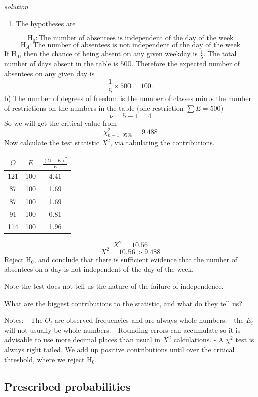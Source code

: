 \documentclass[
]{book}
\providecommand{\tightlist}{%
  \setlength{\itemsep}{0pt}\setlength{\parskip}{0pt}}
\theoremstyle{definition}
\theoremstyle{definition}
\theoremstyle{definition}
\theoremstyle{definition}
\theoremstyle{remark}
\begin{document}
\emph{solution}

\begin{enumerate}
\def\labelenumi{\alph{enumi})}
\tightlist
\item
  The hypotheses are
\end{enumerate}

\[\text{H}_0: \text{The number of absentees is independent of the day of the week}\]
\[\text{H}_A: \text{The number of absentees is not independent of the day of the week}\]
If \(\text{H}_0\), then the chance of being absent on any given weekday is \(\frac{1}{5}\). The total number of days absent in the table is \(500\). Therefore the expected number of absentees on any given day is
\[\frac{1}{5}\times 500 = 100.\]
b) The number of degrees of freedom is the number of classes minus the number of restrictions on the numbers in the table (one restriction \(\sum E= 500\))
\[\nu=5-1=4\]
So we will get the critical value from
\[\chi^2_{n-1, \ 95\%} =9.488\]
Now calculate the test statistic \(X^2\), via tabulating the contributions.

\begin{longtable}[]{@{}ccc@{}}
\toprule
\(O\) & \(E\) & \(\frac{(O-E)^2}{E}\)\tabularnewline
\midrule
\endhead
121 & 100 & 4.41\tabularnewline
87 & 100 & 1.69\tabularnewline
87 & 100 & 1.69\tabularnewline
91 & 100 & 0.81\tabularnewline
114 & 100 & 1.96\tabularnewline
\bottomrule
\end{longtable}

\[X^2 = 10.56\]
\[X^2 = 10.56 > 9.488\]
Reject \(\text{H}_0\), and conclude that there is sufficient evidence that the number of absentees on a day is not independent of the day of the week.

Note the test does not tell us the nature of the failure of independence.

What are the biggest contributions to the statistic, and what do they tell us?

Notes:
- The \(O_i\) are observed frequencies and are always whole numbers.
- the \(E_i\) will not usually be whole numbers.
- Rounding errors can accumulate so it is advisable to use more decimal places than usual in \(X^2\) calculations.
- A \(\chi^2\) test is always right tailed. We add up positive contributions until over the critical threshold, where we reject \(\text{H}_0\).

\hypertarget{prescribed-probabilities}{%
\subsection{Prescribed probabilities}\label{prescribed-probabilities}}
\end{document}
